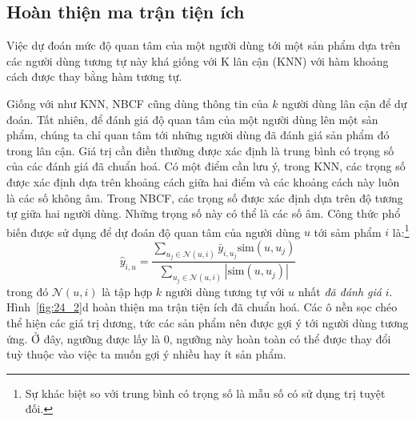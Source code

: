 




\subsection{Hoàn thiện ma trận tiện ích}

Việc {dự đoán mức độ quan tâm} của một
người dùng tới một sản phẩm dựa trên các người dùng tương tự này khá giống với
{K lân cận} (KNN) với hàm khoảng cách được thay bằng hàm tương tự.

Giống với như KNN, NBCF cũng dùng thông tin của $k$ người dùng lân cận để dự
đoán. Tất nhiên, để đánh giá độ quan tâm của một người dùng lên một
sản phẩm, chúng ta chỉ quan tâm tới những người dùng
đã đánh giá sản phẩm đó trong lân cận. {Giá trị cần điền} thường được xác
định là {trung bình có trọng số} của các đánh giá đã chuẩn hoá. Có một điểm cần lưu ý, trong KNN, các trọng số được xác định dựa trên
khoảng cách giữa hai điểm và các khoảng cách này luôn là các số không âm.
Trong NBCF, các trọng số được xác định dựa trên độ tương tự giữa hai
người dùng. Những trọng số này có thể là các số âm. Công thức phổ biến được sử
dụng để dự đoán độ quan tâm của người dùng $u$ tới sảm phẩm $i$
là:\footnote{Sự khác biệt so với trung bình có trọng số là mẫu số có sử dụng trị
tuyệt đối.}
\begin{equation}
\hat{y}_{i, u} = \frac{\sum_{u_j \in \mathcal{N}(u, i)} \bar{y}_{i, u_j} \text{sim}(u, u_j)}{\sum_{u_j \in \mathcal{N}(u, i)} |\text{sim}(u, u_j)|}
\end{equation}
trong đó $\mathcal{N}(u, i)$ là tập hợp $k$ người dùng tương tự với $u$ nhất \textit{đã đánh giá} $i$.
Hình~\ref{fig:24_2}d hoàn thiện
ma trận tiện ích đã chuẩn hoá. Các ô
nền sọc chéo thể hiện các giá trị dương, tức các sản phẩm nên được gợi ý tới người dùng tương ứng. Ở đây, ngưỡng được lấy là 0, ngưỡng này
hoàn toàn có thể được thay đổi tuỳ thuộc vào việc ta muốn gợi ý nhiều hay ít
sản phẩm.


